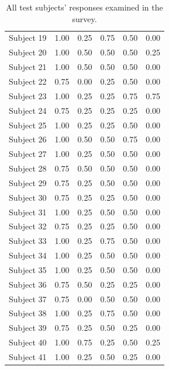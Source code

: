 \begin{appendices}
\begin{table}[!htp]
{\begin{tabular}{l||c|c|c|c|c}
Subject 19 & 1.00 & 0.25 & 0.75 & 0.50 & 0.00 \\
Subject 20 & 1.00 & 0.50 & 0.50 & 0.50 & 0.25 \\
Subject 21 & 1.00 & 0.50 & 0.50 & 0.50 & 0.00 \\
Subject 22 & 0.75 & 0.00 & 0.25 & 0.50 & 0.00 \\
Subject 23 & 1.00 & 0.25 & 0.25 & 0.75 & 0.75 \\
Subject 24 & 0.75 & 0.25 & 0.25 & 0.25 & 0.00 \\
Subject 25 & 1.00 & 0.25 & 0.25 & 0.50 & 0.00 \\
Subject 26 & 1.00 & 0.50 & 0.50 & 0.75 & 0.00 \\
Subject 27 & 1.00 & 0.25 & 0.50 & 0.50 & 0.00 \\
Subject 28 & 0.75 & 0.50 & 0.50 & 0.50 & 0.00 \\
Subject 29 & 0.75 & 0.25 & 0.50 & 0.50 & 0.00 \\
Subject 30 & 0.75 & 0.25 & 0.25 & 0.50 & 0.00 \\
Subject 31 & 1.00 & 0.25 & 0.50 & 0.50 & 0.00 \\
Subject 32 & 0.75 & 0.25 & 0.25 & 0.50 & 0.00 \\
Subject 33 & 1.00 & 0.25 & 0.75 & 0.50 & 0.00 \\
Subject 34 & 1.00 & 0.25 & 0.50 & 0.50 & 0.00 \\
Subject 35 & 1.00 & 0.25 & 0.50 & 0.50 & 0.00 \\
Subject 36 & 0.75 & 0.50 & 0.25 & 0.25 & 0.00 \\
Subject 37 & 0.75 & 0.00 & 0.50 & 0.50 & 0.00 \\
Subject 38 & 1.00 & 0.25 & 0.75 & 0.50 & 0.00 \\
Subject 39 & 0.75 & 0.25 & 0.50 & 0.25 & 0.00 \\
Subject 40 & 1.00 & 0.75 & 0.25 & 0.50 & 0.25 \\
Subject 41 & 1.00 & 0.25 & 0.50 & 0.25 & 0.00 \\
\end{tabular}
}
\caption[Survey: Raw Data]{All test subjects' responses examined in the survey.}
\label{tab:survey_ttest}
\end{table}


\end{appendices}
